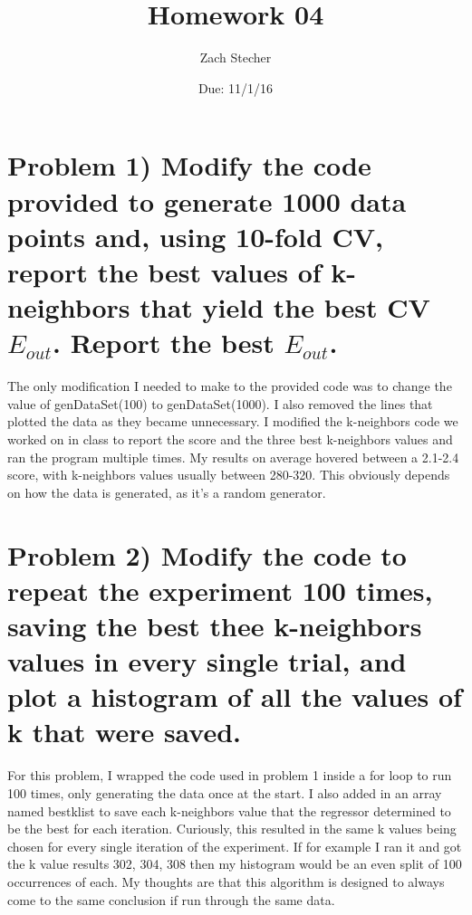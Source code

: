 \documentclass[11pt]{article}
\title{Homework 04}
\author{Zach Stecher}
\date{Due: 11/1/16}
\begin{document}
\maketitle

\section*{Problem 1) Modify the code provided to generate 1000 data points and, using 10-fold CV, report the best values of k-neighbors that yield the best CV $E_{out}$. Report the best $E_{out}$.}

The only modification I needed to make to the provided code was to change the value of genDataSet(100) to genDataSet(1000). I also removed the lines that plotted the data as they became unnecessary. I modified the k-neighbors code we worked on in class to report the score and the three best k-neighbors values and ran the program multiple times. My results on average hovered between a 2.1-2.4 score, with k-neighbors values usually between 280-320. This obviously depends on how the data is generated, as it's a random generator.

\section*{Problem 2) Modify the code to repeat the experiment 100 times, saving the best thee k-neighbors values in every single trial, and plot a histogram of all the values of k that were saved.}

For this problem, I wrapped the code used in problem 1 inside a for loop to run 100 times, only generating the data once at the start. I also added in an array named bestklist to save each k-neighbors value that the regressor determined to be the best for each iteration. Curiously, this resulted in the same k values being chosen for every single iteration of the experiment. If for example I ran it and got the k value results 302, 304, 308 then my histogram would be an even split of 100 occurrences of each. My thoughts are that this algorithm is designed to always come to the same conclusion if run through the same data. 
\end{document}
